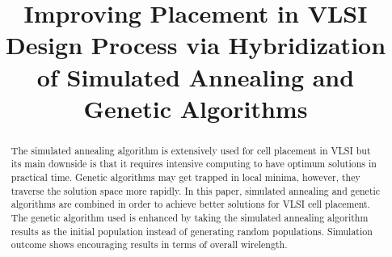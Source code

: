 \documentclass[conference]{IEEEtran}
\begin{document}

\title{Improving Placement in VLSI Design Process via Hybridization of Simulated Annealing and Genetic Algorithms \\}


\author{
}


\maketitle


\begin{abstract}

The simulated annealing algorithm is extensively used for cell placement in VLSI but its main downside is that it requires intensive computing to have optimum solutions in practical time. Genetic algorithms may get trapped in local minima, however, they traverse the solution space more rapidly. In this paper, simulated annealing and genetic algorithms are combined in order to achieve better solutions for VLSI cell placement. The genetic algorithm used is enhanced by taking the simulated annealing algorithm results as the initial population instead of generating random populations. Simulation outcome shows encouraging results in terms of overall wirelength.

\end{abstract}
\end{document}
